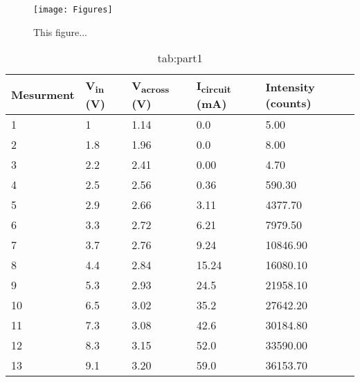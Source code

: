\begin{figure}[H]
    \centering    \texttt{[image: Figures]}
    \caption{This figure...}
    \label{fig:}
\end{figure}





\begin{table}[H]
    \centering
    \begin{tabular}{@{}lllll@{}}
        \toprule
        Mesurment & V\textsubscript{in} (V) & V\textsubscript{across} (V) & I\textsubscript{circuit} (mA) & Intensity (counts) \\ \midrule
        1         & 1                       & 1.14                        & 0.0                           & 5.00               \\
        2         & 1.8                     & 1.96                        & 0.0                           & 8.00               \\
        3         & 2.2                     & 2.41                        & 0.00                          & 4.70               \\
        4         & 2.5                     & 2.56                        & 0.36                          & 590.30             \\
        5         & 2.9                     & 2.66                        & 3.11                          & 4377.70            \\
        6         & 3.3                     & 2.72                        & 6.21                          & 7979.50            \\
        7         & 3.7                     & 2.76                        & 9.24                          & 10846.90           \\
        8         & 4.4                     & 2.84                        & 15.24                         & 16080.10           \\
        9         & 5.3                     & 2.93                        & 24.5                          & 21958.10           \\
        10        & 6.5                     & 3.02                        & 35.2                          & 27642.20           \\
        11        & 7.3                     & 3.08                        & 42.6                          & 30184.80           \\
        12        & 8.3                     & 3.15                        & 52.0                          & 33590.00           \\
        13        & 9.1                     & 3.20                        & 59.0                          & 36153.70           \\ \bottomrule
        \end{tabular}
    \caption{tab:part1}
\end{table}